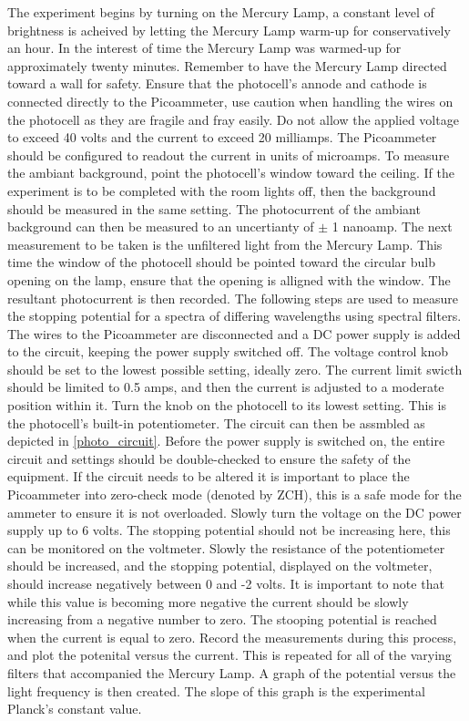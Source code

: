 \documentclass[a4paper]{article}
\begin{document}

\qq The experiment begins by turning on the Mercury Lamp, a constant
level of brightness is acheived by letting the Mercury Lamp warm-up
for conservatively an hour. In the interest of time the Mercury Lamp
was warmed-up for approximately twenty minutes. Remember to have the
Mercury Lamp directed toward a wall for safety. Ensure that the
photocell's annode and cathode is connected directly to the
Picoammeter, use caution when handling the wires on the photocell as
they are fragile and fray easily. Do not allow the applied voltage to
exceed 40 volts and the current to exceed 20 milliamps. The
Picoammeter should be configured to readout the current in units of
microamps. To measure the ambiant background, point the photocell's
window toward the ceiling. If the experiment is to be completed with
the room lights off, then the background should be measured in the
same setting. The photocurrent of the ambiant background can then be
measured to an uncertianty of $\pm$ 1 nanoamp. The next measurement to
be taken is the unfiltered light from the Mercury Lamp. This time the
window of the photocell should be pointed toward the circular bulb
opening on the lamp, ensure that the opening is alligned with the
window. The resultant photocurrent is then recorded. The following
steps are used to measure the stopping potential for a spectra of
differing wavelengths using spectral filters. The wires to the
Picoammeter are disconnected and a DC power supply is added to the
circuit, keeping the power supply switched off. The voltage control
knob should be set to the lowest possible setting, ideally zero. The
current limit swicth should be limited to 0.5 amps, and then the
current is adjusted to a moderate position within it. Turn the knob on
the photocell to its lowest setting. This is the photocell's built-in
potentiometer. The circuit can then be assmbled as depicted in
\ref{photo_circuit}. Before the power supply is switched on, the
entire circuit and settings should be double-checked to ensure the
safety of the equipment. If the circuit needs to be altered it is
important to place the Picoammeter into zero-check mode (denoted by
ZCH), this is a safe mode for the ammeter to ensure it is not
overloaded. Slowly turn the voltage on the DC power supply up to 6
volts. The stopping potential should not be increasing here, this can
be monitored on the voltmeter. Slowly the resistance of the
potentiometer should be increased, and the stopping potential,
displayed on the voltmeter, should increase negatively between 0 and
-2 volts. It is important to note that while this value is becoming
more negative the current should be slowly increasing from a negative
number to zero. The stooping potential is reached when the current is
equal to zero. Record the measurements during this process, and plot
the potenital versus the current. This is repeated for all of the
varying filters that accompanied the Mercury Lamp. A graph of the
potential versus the light frequency is then created. The slope of
this graph is the experimental Planck's constant value.
\end{document}
